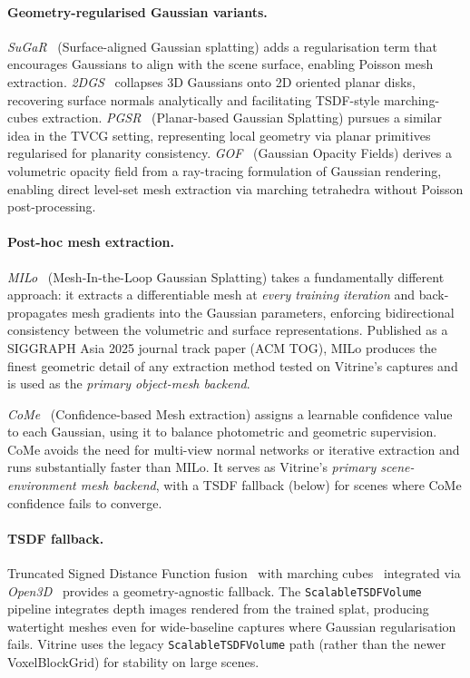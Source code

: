 \paragraph{Geometry-regularised Gaussian variants.}
\emph{SuGaR}~\cite{guedon2024_sugar} (Surface-aligned Gaussian splatting) adds a
regularisation term that encourages Gaussians to align with the scene surface,
enabling Poisson mesh extraction.  \emph{2DGS}~\cite{huang2024_2dgs} collapses 3D
Gaussians onto 2D oriented planar disks, recovering surface normals analytically and
facilitating TSDF-style marching-cubes extraction.  \emph{PGSR}~\cite{chen2024_pgsr}
(Planar-based Gaussian Splatting) pursues a similar idea in the TVCG setting,
representing local geometry via planar primitives regularised for planarity
consistency.  \emph{GOF}~\cite{yu2024_gof} (Gaussian Opacity Fields) derives a
volumetric opacity field from a ray-tracing formulation of Gaussian rendering,
enabling direct level-set mesh extraction via marching tetrahedra without Poisson
post-processing.

\paragraph{Post-hoc mesh extraction.}
\emph{MILo}~\cite{guedon2025_milo} (Mesh-In-the-Loop Gaussian Splatting) takes a
fundamentally different approach: it extracts a differentiable mesh at \emph{every
training iteration} and back-propagates mesh gradients into the Gaussian parameters,
enforcing bidirectional consistency between the volumetric and surface
representations.  Published as a SIGGRAPH Asia 2025 journal track paper (ACM TOG),
MILo produces the finest geometric detail of any extraction method tested on
Vitrine's captures and is used as the \emph{primary object-mesh backend}.

\emph{CoMe}~\cite{radl2026_come} (Confidence-based Mesh extraction) assigns a
learnable confidence value to each Gaussian, using it to balance photometric and
geometric supervision.  CoMe avoids the need for multi-view normal networks or
iterative extraction and runs substantially faster than MILo.  It serves as
Vitrine's \emph{primary scene-environment mesh backend}, with a TSDF fallback
(below) for scenes where CoMe confidence fails to converge.

\paragraph{TSDF fallback.}
Truncated Signed Distance Function fusion~\cite{curless1996_tsdf} with marching
cubes~\cite{lorensen1987_marching} integrated via \emph{Open3D}~\cite{zhou2018_open3d}
provides a geometry-agnostic fallback.  The \texttt{ScalableTSDFVolume} pipeline
integrates depth images rendered from the trained splat, producing watertight meshes
even for wide-baseline captures where Gaussian regularisation fails.  Vitrine uses
the legacy \texttt{ScalableTSDFVolume} path (rather than the newer VoxelBlockGrid)
for stability on large scenes.

